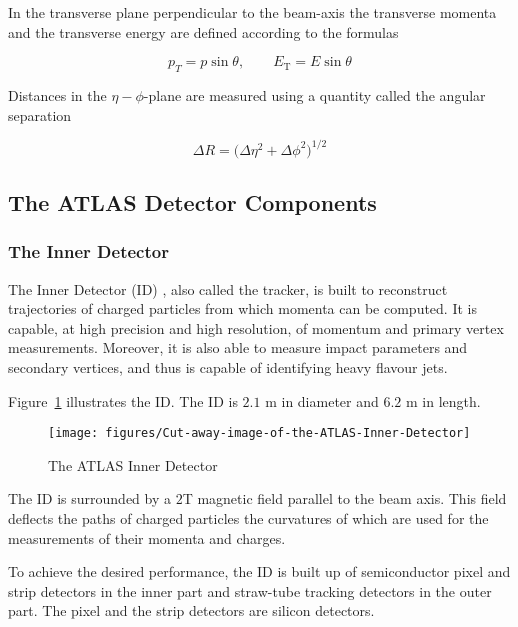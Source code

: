 In the transverse plane perpendicular to the beam-axis the transverse momenta
and the transverse energy are defined according to the formulas

$$p_T = p\sin\theta, \qquad E_{\text{T}} = E\sin\theta $$

Distances in the $\eta-\phi$-plane are measured using a quantity called the
angular separation

\begin{equation}\label{eq:angulardr}
	\Delta R = \big(\Delta \eta^2 + \Delta \phi^2\big)^{1/2}
\end{equation}

\subsection{The ATLAS Detector Components}



\subsubsection{The Inner Detector}\label{s:decinner}

The Inner Detector (ID) \cite{lhcaccexp}, also called the tracker, is built to
reconstruct trajectories of charged particles from which momenta can be
computed. It is capable, at high precision and high resolution, of momentum and
primary vertex measurements. Moreover, it is also able to measure impact
parameters and secondary vertices, and thus is capable of identifying heavy
flavour jets.

Figure~\ref{f:innerd} illustrates the ID. The ID is $2.1$ m in diameter and
$6.2$ m in length.



\begin{figure}[H]
	\texttt{[image: figures/Cut-away-image-of-the-ATLAS-Inner-Detector]}
	\centering
	\caption{The ATLAS Inner Detector}
	\label{f:innerd}
\end{figure}


The ID is surrounded by a $2$T magnetic field parallel to the beam axis. This
field deflects the paths of charged particles the curvatures of which are used
for the measurements of their momenta and charges.

To achieve the desired performance, the ID is built up of semiconductor pixel
and strip detectors in the inner part and straw-tube tracking detectors in the
outer part. The pixel and the strip detectors are silicon detectors.

